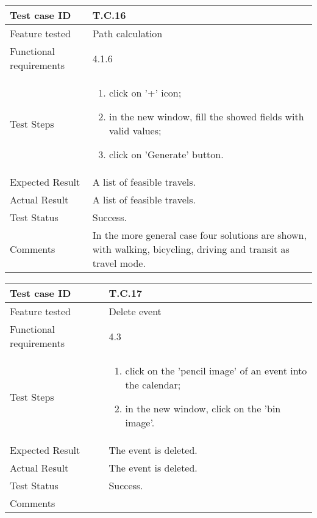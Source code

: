 \begin{table}[H]
	\begin{center}
		\begin{tabular}{ | p{} | p{} | }
		\hline
		Test case ID & T.C.16\\
		\hline
		Feature tested & Path calculation\\
		\hline
		Functional requirements & 4.1.6 \\
    	\hline
		Test Steps & 
			\begin{enumerate}
				\item click on '+' icon;
				\item in the new window, fill the showed fields with valid values;
				\item click on 'Generate' button.
			\end{enumerate} \\
		\hline
		Expected Result & A list of feasible travels.\\
		\hline
		Actual Result & A list of feasible travels.\\ 
		\hline
		Test Status & \color{ForestGreen}Success.\\ 
		\hline
		Comments & In the more general case four solutions are shown, with  walking, bicycling, driving and transit as travel mode. \\ 
		\hline
		
		\end{tabular}
	\end{center}
\end{table}

\begin{table}[H]
	\begin{center}
		\begin{tabular}{ | p{} | p{} | }
		\hline
		Test case ID & T.C.17\\
		\hline
		Feature tested & Delete event\\
		\hline
		Functional requirements & 4.3 \\
    	\hline
		Test Steps & 
			\begin{enumerate}
				\item click on the 'pencil image' of an event into the calendar;
				\item in the new window, click on the 'bin image'.
			\end{enumerate} \\
		\hline
		Expected Result & The event is deleted.\\
		\hline
		Actual Result & The event is deleted.\\ 
		\hline
		Test Status & \color{ForestGreen}Success.\\ 
		\hline
		Comments & \\ 
		\hline
		
		\end{tabular}
	\end{center}
\end{table}

